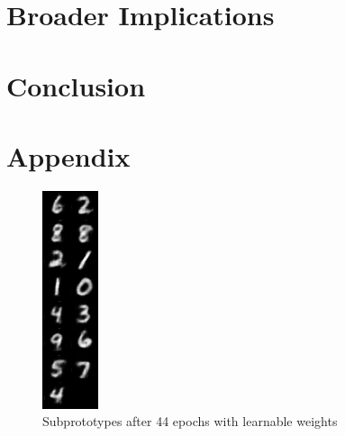 \documentclass[sigconf,authordraft]{acmart}
\begin{document}
\section{Broader Implications}


\section{Conclusion}





\newpage
\section*{Appendix}

\begin{figure}
    \centering
    \includegraphics{img/subprot44.png}
    \caption{Subprototypes after 44 epochs with learnable weights}
    \label{subprots}
\end{figure}
\end{document}
